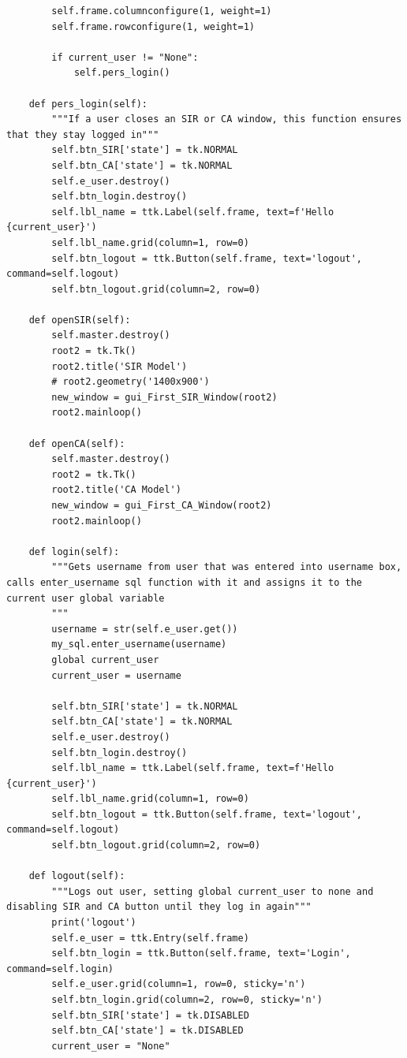\documentclass[11pt, a4paper]{article}
\begin{document}
\begin{lstlisting}
        self.frame.columnconfigure(1, weight=1)
        self.frame.rowconfigure(1, weight=1)

        if current_user != "None":
            self.pers_login()

    def pers_login(self):
        """If a user closes an SIR or CA window, this function ensures that they stay logged in"""
        self.btn_SIR['state'] = tk.NORMAL
        self.btn_CA['state'] = tk.NORMAL
        self.e_user.destroy()
        self.btn_login.destroy()
        self.lbl_name = ttk.Label(self.frame, text=f'Hello {current_user}')
        self.lbl_name.grid(column=1, row=0)
        self.btn_logout = ttk.Button(self.frame, text='logout', command=self.logout)
        self.btn_logout.grid(column=2, row=0)

    def openSIR(self):
        self.master.destroy()
        root2 = tk.Tk()
        root2.title('SIR Model')
        # root2.geometry('1400x900')
        new_window = gui_First_SIR_Window(root2)
        root2.mainloop()

    def openCA(self):
        self.master.destroy()
        root2 = tk.Tk()
        root2.title('CA Model')
        new_window = gui_First_CA_Window(root2)
        root2.mainloop()

    def login(self):
        """Gets username from user that was entered into username box, calls enter_username sql function with it and assigns it to the current user global variable
        """
        username = str(self.e_user.get())
        my_sql.enter_username(username)
        global current_user
        current_user = username

        self.btn_SIR['state'] = tk.NORMAL
        self.btn_CA['state'] = tk.NORMAL
        self.e_user.destroy()
        self.btn_login.destroy()
        self.lbl_name = ttk.Label(self.frame, text=f'Hello {current_user}')
        self.lbl_name.grid(column=1, row=0)
        self.btn_logout = ttk.Button(self.frame, text='logout', command=self.logout)
        self.btn_logout.grid(column=2, row=0)

    def logout(self):
        """Logs out user, setting global current_user to none and disabling SIR and CA button until they log in again"""
        print('logout')
        self.e_user = ttk.Entry(self.frame)
        self.btn_login = ttk.Button(self.frame, text='Login', command=self.login)
        self.e_user.grid(column=1, row=0, sticky='n')
        self.btn_login.grid(column=2, row=0, sticky='n')
        self.btn_SIR['state'] = tk.DISABLED
        self.btn_CA['state'] = tk.DISABLED
        current_user = "None"



\end{lstlisting}
\end{document}
